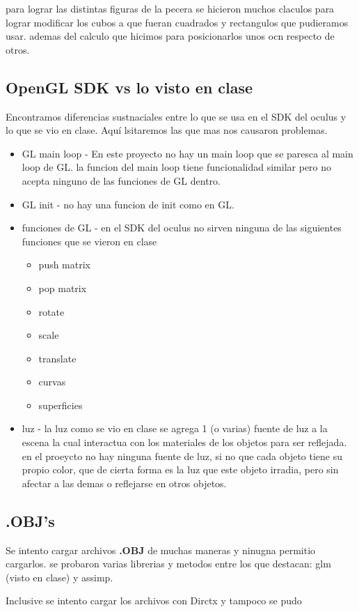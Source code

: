 \documentclass[10pt, a4paper, twocolumn]{article}
\begin{document}
para lograr las distintas figuras de la pecera se hicieron muchos claculos para lograr modificar los cubos a que fueran cuadrados y rectangulos que pudieramos usar. ademas del calculo que hicimos para posicionarlos unos ocn respecto de otros.

\subsection{OpenGL SDK vs lo visto en clase}
Encontramos diferencias sustnaciales entre lo que se usa en el SDK del oculus y lo que se vio en clase. Aquí lsitaremos las que mas nos causaron problemas. \begin{itemize}
\item GL main loop - En este proyecto no hay un main loop que se paresca al main loop de GL. la funcion del main loop tiene funcionalidad similar pero no acepta ninguno de las funciones de GL dentro.
\item GL init - no hay una funcion de init como en GL.
\item funciones de GL - en el SDK del oculus no sirven ninguna de las siguientes funciones que se vieron en clase
\begin{itemize}
\item push matrix
\item pop matrix
\item rotate
\item scale 
\item translate
\item curvas 
\item superficies
\end{itemize}
\item luz - la luz como se vio en clase se agrega 1 (o varias) fuente de luz a la escena la cual interactua con los materiales de los objetos para ser reflejada. en el proeycto no hay ninguna fuente de luz, si no que cada objeto tiene su propio color, que de cierta forma es la luz que este objeto irradia, pero sin afectar a las demas o reflejarse en otros objetos.
\end{itemize}

\subsection{.OBJ's}
Se intento cargar archivos \textbf{.OBJ} de muchas maneras y ninugna permitio cargarlos. se probaron varias librerias y metodos entre los que destacan: glm (visto en clase) y assimp.

Inclusive se intento cargar los archivos con Dirctx y tampoco se pudo
\end{document}
